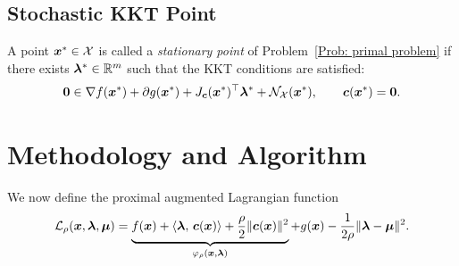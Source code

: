 \documentclass[10pt]{article}
\begin{document}
\subsection{Stochastic KKT Point}
\begin{definition}
\label{def:stationary}
A point $\bm{x}^* \in \mathcal{X}$ is called a \emph{stationary point} of
Problem~\eqref{Prob: primal problem} if there exists $\bm{\lambda}^* \in \mathbb{R}^m$
such that the KKT conditions are satisfied:
\begin{equation}
    \mathbf{0} \in \nabla f(\bm{x}^*) + \partial g(\bm{x}^*)
    + J_{\bm{c}}(\bm{x}^*)^\top \bm{\lambda}^* + \mathcal{N}_{\mathcal{X}}(\bm{x}^*),
    \qquad \bm{c}(\bm{x}^*) = \mathbf{0}.
\end{equation}
\end{definition}
\section{Methodology and Algorithm}
\label{sec:method}

We now define the proximal augmented Lagrangian function
\begin{equation}\label{eq:reduced_ppl}
    \mathcal{L}_{\rho}(\bm{x}, \bm{\lambda}, \bm{\mu})
    = \underbrace{f(\bm{x}) + \langle \bm{\lambda},\, \bm{c}(\bm{x}) \rangle + \frac{\rho}{2}\|\bm{c}(\bm{x})\|^2}_{\varphi_{\rho}(\bm{x}, \bm{\lambda})} + g(\bm{x}) - \frac{1}{2\rho}\|\bm{\lambda} - \bm{\mu}\|^2.
\end{equation}
\end{document}
